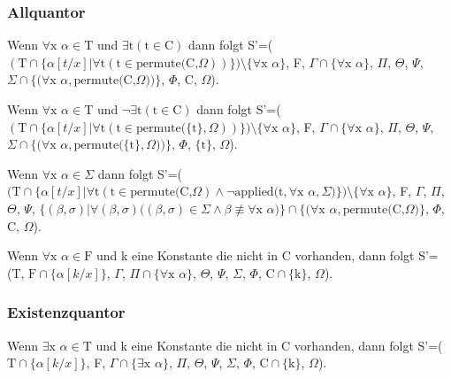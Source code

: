 \subsubsection{Allquantor}
Wenn $\forall\textrm{x}$ $\alpha\in\textrm{T}$ und $\exists\textrm{t}(\textrm{t}\in\textrm{C})$ dann folgt S'=($(\textrm{T}\cap\lbrace\alpha[t/x]|\forall\textrm{t}(\textrm{t}\in\textrm{permute(C,}\Omega))\rbrace)\setminus\lbrace\forall\textrm{x}$ $\alpha\rbrace$, F, $\Gamma\cap\lbrace\forall\textrm{x}$ $\alpha\rbrace$, $\Pi$, $\Theta$, $\Psi$, $\Sigma\cap\lbrace(\forall\textrm{x}$ $\alpha,\textrm{permute(C,}\Omega))\rbrace$, $\Phi$, C, $\Omega$).

Wenn $\forall\textrm{x}$ $\alpha\in\textrm{T}$ und $\neg\exists\textrm{t}(\textrm{t}\in\textrm{C})$ dann folgt S'=($(\textrm{T}\cap\lbrace\alpha[t/x]|\forall\textrm{t}(\textrm{t}\in\textrm{permute(}\lbrace\textrm{t}\rbrace,\Omega))\rbrace)\setminus\lbrace\forall\textrm{x}$ $\alpha\rbrace$, F, $\Gamma\cap\lbrace\forall\textrm{x}$ $\alpha\rbrace$, $\Pi$, $\Theta$, $\Psi$, $\Sigma\cap\lbrace(\forall\textrm{x}$ $\alpha,\textrm{permute(}\lbrace\textrm{t}\rbrace,\Omega))\rbrace$, $\Phi$, $\lbrace\textrm{t}\rbrace$, $\Omega$).

Wenn $\forall\textrm{x}$ $\alpha\in\Sigma$ dann folgt S'=($(\textrm{T}\cap\lbrace\alpha[t/x]|\forall\textrm{t}(\textrm{t}\in\textrm{permute(C,}\Omega)\wedge\neg\textrm{applied(t},\forall\textrm{x}$ $\alpha, \Sigma)\rbrace)\setminus\lbrace\forall\textrm{x}$ $\alpha\rbrace$, F, $\Gamma$, $\Pi$, $\Theta$, $\Psi$, $\lbrace(\beta,\sigma)|\forall(\beta,\sigma)((\beta,\sigma)\in\Sigma\wedge\beta \not\equiv \forall\textrm{x}$ $\alpha)\rbrace\cap\lbrace(\forall\textrm{x}$ $\alpha,\textrm{permute(C,}\Omega)\rbrace$, $\Phi$, C, $\Omega$).

Wenn $\forall\textrm{x}$ $\alpha\in\textrm{F}$ und k eine Konstante die nicht in C vorhanden, dann folgt S'=(T, $\textrm{F}\cap\lbrace\alpha[k/x]\rbrace$, $\Gamma$, $\Pi\cap\lbrace\forall\textrm{x}$ $\alpha\rbrace$, $\Theta$, $\Psi$, $\Sigma$, $\Phi$, $\textrm{C}\cap\lbrace\textrm{k}\rbrace$, $\Omega$).

\subsubsection{Existenzquantor}
Wenn $\exists\textrm{x}$ $\alpha\in\textrm{T}$ und k eine Konstante die nicht in C vorhanden, dann folgt S'=($\textrm{T}\cap\lbrace\alpha[k/x]\rbrace$, F, $\Gamma\cap\lbrace\exists\textrm{x}$ $\alpha\rbrace$, $\Pi$, $\Theta$, $\Psi$, $\Sigma$, $\Phi$, $\textrm{C}\cap\lbrace\textrm{k}\rbrace$, $\Omega$).

